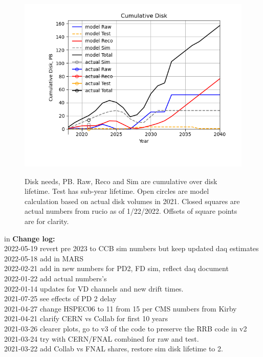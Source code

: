 \documentclass[12pt]{article}
\begin{document}
\begin{figure}[h]
\centering\includegraphics[height=0.4\textwidth]{Parameters_2022-07-10-2040-Cumulative-Disk}\label{CumulativeDisk}
\caption{Disk needs, PB.  Raw, Reco and Sim are cumulative over disk lifetime.  Test has sub-year lifetime.  Open circles are model calculation based on actual disk volumes in 2021. Closed squares are actual numbers from rucio as of 1/22/2022. Offsets of square points are for clarity.}
\end{figure}
 in\pagebreak 
 {\bf Change log:}\\
2022-05-19 revert pre 2023 to CCB sim numbers but keep updated daq estimates\\2022-05-18 add in MARS\\2022-02-21 add in new numbers for PD2, FD sim, reflect daq document\\2022-01-22 add actual numbers's\\2022-01-14 updates for VD channels and new drift times.\\2021-07-25 see effects of PD 2 delay\\2021-04-27 change HSPEC06 to 11 from 15 per CMS numbers from Kirby\\2021-04-21 clarify CERN vs Collab for first 10 years\\2021-03-26 clearer plots, go to v3 of the code to preserve the RRB code in v2\\2021-03-24 try with CERN/FNAL combined for raw and test.\\2021-03-22 add Collab vs FNAL shares, restore sim disk lifetime to 2.\\
\end{document}
